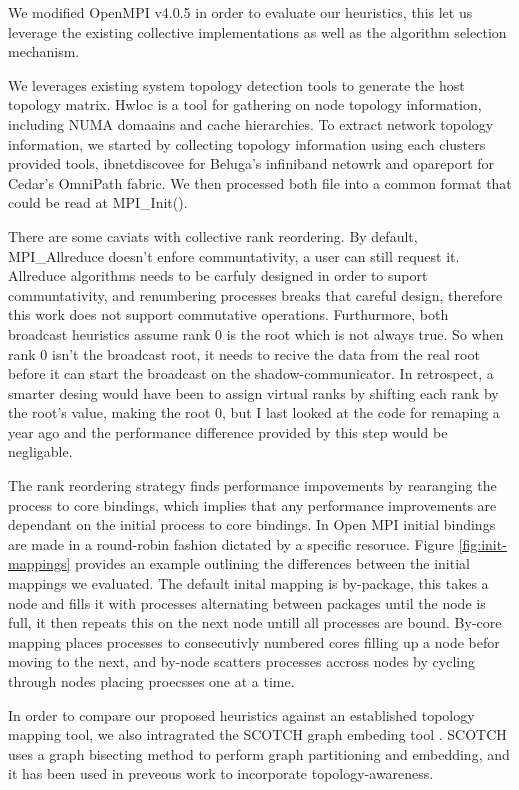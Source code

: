 We modified OpenMPI v4.0.5 \cite{gabriel2004OpenMPI} in order to evaluate our heuristics, this let us leverage the existing collective implementations as well as the algorithm selection mechanism.

We leverages existing system topology detection tools to generate the host topology matrix.
Hwloc \cite{Broquedis2010hwloc} is a tool for gathering on node topology information, including NUMA domaains and cache hierarchies.
To extract network topology information, we started by collecting topology information using each clusters provided tools, ibnetdiscovee for Beluga's infiniband netowrk and opareport for Cedar's OmniPath fabric.
We then processed both file into a common format that could be read at MPI\_Init().

There are some caviats with collective rank reordering.
By default, MPI\_Allreduce doesn't enfore communtativity, a user can still request it. 
Allreduce algorithms needs to be carfuly designed in order to suport communtativity, and renumbering processes breaks that careful design, therefore this work does not support commutative operations.
Furthurmore, both broadcast heuristics assume rank 0 is the root which is not always true. 
So when rank 0 isn't the broadcast root, it needs to recive the data from the real root before it can start the broadcast on the shadow-communicator.
In retrospect, a smarter desing would have been to assign virtual ranks by shifting each rank by the root's value, making the root 0, but I last looked at the code for remaping a year ago and the performance difference provided by this step would be negligable.

The rank reordering strategy finds performance impovements by rearanging the process to core bindings, which implies that any performance improvements are dependant on the initial process to core bindings.
In Open MPI initial bindings are made in a round-robin fashion dictated by a specific resoruce. 
Figure \ref{fig:init-mappings} provides an example outlining the differences between the initial mappings we evaluated.
The default inital mapping is by-package, this takes a node and fills it with processes alternating between packages until the node is full, it then repeats this on the next node untill all processes are bound.
By-core mapping places processes to consecutivly numbered cores filling up a node befor moving to the next, and by-node scatters processes accross nodes by cycling through nodes placing proecsses one at a time.

In order to compare our proposed heuristics against an established topology mapping tool, we also intragrated the SCOTCH graph embeding tool \cite{Pellegrini2012SCOTCH}.
SCOTCH uses a graph bisecting method to perform graph partitioning and embedding, and it has been used in preveous work to incorporate topology-awareness.

